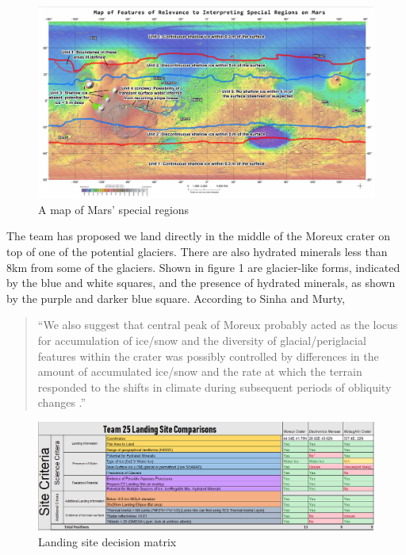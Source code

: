 \documentclass[%
 portrait,
 aapm,
 mph,%
 amsmath,amssymb,
 reprint,%
]{revtex4-2}
\begin{document}
\begin{figure}
  \includegraphics[width=\textwidth]{LandingSite/3_1_3_MarsUnits.png}
  \caption{A map of Mars' special regions}
\end{figure}

The team has proposed we land directly in the middle of the Moreux crater on top of one of the potential glaciers. There are also hydrated minerals less than 8km from some of the glaciers. Shown in figure 1 are glacier-like forms, indicated by the blue and white squares, and the presence of hydrated minerals, as shown by the purple and darker blue square. According to Sinha and Murty, \begin{quote}
    “We also suggest that central peak of Moreux probably acted as the locus for accumulation of ice/snow and the diversity of glacial/periglacial features within the crater was possibly controlled by differences in the amount of accumulated ice/snow and the rate at which the terrain responded to the shifts in climate during subsequent periods of obliquity changes \cite{sinha2015amazonian}.”
\end{quote}
\begin{figure}
  \includegraphics[width=\textwidth]{LandingSite/yLandingSDM.png}
   \caption{Landing site decision matrix}
\end{figure} 
\end{document}
